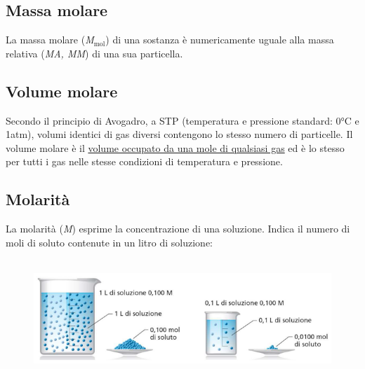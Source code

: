 \documentclass{article}
\begin{document}
\subsection{Massa molare}
La massa molare (\textit{M$_{\text{mol}}$}) di una sostanza è numericamente uguale alla massa relativa (\textit{MA, MM})
di una sua particella.
\begin{figure}[h!]
    \begin{center}
    \end{center}
\end{figure}
\subsection{Volume molare}
Secondo il principio di Avogadro, a STP (temperatura e pressione standard: 0°C e 1atm),
volumi identici di gas diversi contengono lo stesso numero di particelle. Il volume molare è 
il \underline{volume occupato da una mole di qualsiasi gas} ed è lo stesso per tutti i gas nelle 
stesse condizioni di temperatura e pressione.
\begin{figure}[h!]
    \begin{center}
    \end{center}
\end{figure}
\subsection{Molarità}
La molarità (\textit{M}) esprime la concentrazione di una soluzione.
Indica il numero di moli di soluto contenute in un litro di soluzione:
\begin{figure}[h!]
    \begin{center}
        \\
            \includegraphics[width=.7\textwidth]{Molarità.png}
    \end{center}
\end{figure}
\end{document}
